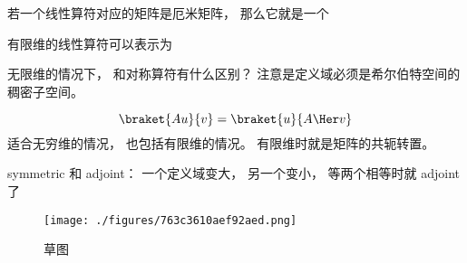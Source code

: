
\begin{issues}
\issueDraft
\end{issues}



若一个线性算符对应的矩阵是厄米矩阵， 那么它就是一个

有限维的线性算符可以表示为

无限维的情况下， 和对称算符有什么区别？ 注意是定义域必须是希尔伯特空间的稠密子空间。


\begin{equation}
\braket{Au}{v} = \braket{u}{A\Her v}
\end{equation}
适合无穷维的情况， 也包括有限维的情况。 有限维时就是矩阵的共轭转置。

symmetric 和 adjoint： 一个定义域变大， 另一个变小， 等两个相等时就 adjoint 了
\begin{figure}[ht]
\centering
\texttt{[image: ./figures/763c3610aef92aed.png]}
\caption{草图} \label{fig_adjoin_1}
\end{figure}
